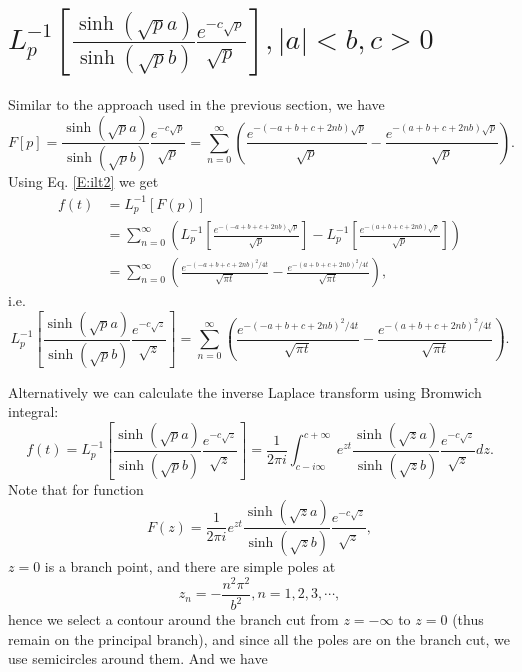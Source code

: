 \section{$L_p^{-1}[ \frac{\sinh (\sqrt{p} a)}{\sinh (\sqrt{p} b)} 
          \frac{e^{-c\sqrt{p}}}{\sqrt{p}} ], |a|<b, c>0$ }
Similar to the approach used in the previous section, we have
\[
	F[p] = \frac{\sinh (\sqrt{p} a)}{\sinh (\sqrt{p} b)} 
         \frac{e^{-c\sqrt{p}}}{\sqrt{p}} 
				 = \sum_{n=0}^{\infty} 
				 \left(
					 \frac{e^{-(-a+b+c+2nb)\sqrt{p}}}{\sqrt{p}}
					 -\frac{e^{-(a+b+c+2nb)\sqrt{p}}}{\sqrt{p}}
				 \right).
\]
Using Eq. \ref{E:ilt2} we get
\begin{align*}
	f(t)
	&= L_p^{-1}[F(p)]   \\
	&= \sum_{n=0}^{\infty} 
	   \left(
			  L_p^{-1} \left[ \frac{e^{-(-a+b+c+2nb)\sqrt{p}}}{\sqrt{p}} \right]
				-L_p^{-1} \left[ \frac{e^{-(a+b+c+2nb)\sqrt{p}}}{\sqrt{p}} \right]
		 \right) \\
	&= \sum_{n=0}^{\infty} 
	   \left(
			 \frac{ e^{-(-a+b+c+2nb)^2/4t} }{\sqrt{\pi t}}
			 - \frac{ e^{-(a+b+c+2nb)^2/4t} }{\sqrt{\pi t}}
		 \right), 
\end{align*}
i.e.
\begin{equation}
  L_p^{-1}\left[ \frac{\sinh (\sqrt{p} a)}{\sinh (\sqrt{p} b)} 
				         \frac{e^{-c\sqrt{z}}}{\sqrt{z}} \right]
	= \sum_{n=0}^{\infty} 
	   \left(
			 \frac{ e^{-(-a+b+c+2nb)^2/4t} }{\sqrt{\pi t}}
			 - \frac{ e^{-(a+b+c+2nb)^2/4t} }{\sqrt{\pi t}}
		 \right).
\end{equation}

Alternatively we can calculate the inverse Laplace transform using Bromwich 
integral:
\[
  f(t)= L_p^{-1}\left[ \frac{\sinh (\sqrt{p} a)}{\sinh (\sqrt{p} b)} 
				               \frac{e^{-c\sqrt{z}}}{\sqrt{z}} \right]
	    = \frac{1}{2\pi i} 
			  \int_{c-i\infty}^{c+\infty} 
		      e^{zt} \frac{\sinh (\sqrt{z} a)}{\sinh (\sqrt{z} b)} 
				  \frac{e^{-c\sqrt{z}}}{\sqrt{z}} 
				dz.
\]
Note that for function
\[
	F(z)= \frac{1}{2\pi i} e^{zt} \frac{\sinh (\sqrt{z} a)}{\sinh (\sqrt{z} b)} 
			  \frac{e^{-c\sqrt{z}}}{\sqrt{z}},
\]
$z=0$ is a branch point, and there are simple poles at
\[
	z_n=-\frac{n^2 \pi^2}{b^2}, n=1,2,3,\cdots,
\]
hence we select a contour around the branch cut from $z=-\infty$ to $z=0$ (thus
remain on the principal branch), and since all the poles are on the branch cut, 
we use semicircles around them. And we have

